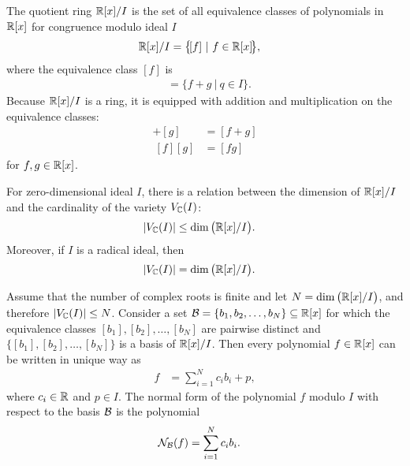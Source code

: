 The quotient ring $\mathbb{R}[x]/I$ is the set of all equivalence classes of polynomials in $\mathbb{R}[x]$ for congruence modulo ideal $I$
\begin{align}
  \mathbb{R}[x]/I &= \big\{\![f]\ |\ f\in\mathbb{R}[x]\!\big\},
\end{align}
where the equivalence class $[f]$ is
\begin{align}
  [f] &= \big\{f+g\ |\ q\in I\big\}.
\end{align}
Because $\mathbb{R}[x]/I$ is a ring, it is equipped with addition and multiplication on the equivalence classes:
\begin{align}
  [f] + [g] &= [f + g]\\
  ~[f][g] &= [fg]
\end{align}
for $f, g\in\mathbb{R}[x]$.

For zero-dimensional ideal $I$, there is a relation between the dimension of $\mathbb{R}[x]/I$ and the cardinality of the variety $V_{\mathbb{C}}(I)$:
\begin{align}
  |V_{\mathbb{C}}(I)| &\leq \dim\big(\mathbb{R}[x]/I\big).
\end{align}
Moreover, if $I$ is a radical ideal, then
\begin{align}
  |V_{\mathbb{C}}(I)| &= \dim\big(\mathbb{R}[x]/I\big).
\end{align}

Assume that the number of complex roots is finite and let $N = \dim\big(\mathbb{R}[x]/I\big)$, and therefore $|V_{\mathbb{C}}(I)|\leq N$.
Consider a set $\mathcal{B} = \{b_1, b_2, \ldots, b_N\} \subseteq \mathbb{R}[x]$ for which the equivalence classes $[b_1], [b_2], \ldots, [b_N]$ are pairwise distinct and $\big\{\![b_1], [b_2], \ldots, [b_N]\!\big\}$ is a basis of $\mathbb{R}[x]/I$.
Then every polynomial $f\in\mathbb{R}[x]$ can be written in unique way as
\begin{align}
  f &= \sum_{i=1}^Nc_ib_i + p,
\end{align}
where $c_i\in\mathbb{R}$ and $p\in I$.
The normal form of the polynomial $f$ modulo $I$ with respect to the basis $\mathcal{B}$ is the polynomial
\begin{align}
  \mathcal{N}_{\mathcal{B}}(f) &= \sum_{i=1}^N c_ib_i.
\end{align}

